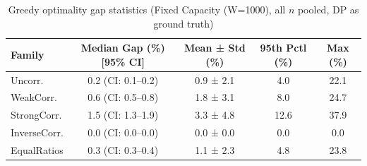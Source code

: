 \begin{table}[tb]
\centering
\caption{Greedy optimality gap statistics (Fixed Capacity (W=1000), all $n$ pooled, DP as ground truth)}
\label{tab:fixed-greedy-gap}
\begin{tabular}{lcccc}
\toprule
Family & Median Gap (\%) [95\% CI] & Mean ± Std (\%) & 95th Pctl (\%) & Max (\%) \\
\midrule
Uncorr. & 0.2 (CI: 0.1–0.2) & 0.9 ± 2.1 & 4.0 & 22.1 \\
WeakCorr. & 0.6 (CI: 0.5–0.8) & 1.8 ± 3.1 & 8.0 & 24.7 \\
StrongCorr. & 1.5 (CI: 1.3–1.9) & 3.3 ± 4.8 & 12.6 & 37.9 \\
InverseCorr. & 0.0 (CI: 0.0–0.0) & 0.0 ± 0.0 & 0.0 & 0.0 \\
EqualRatios & 0.3 (CI: 0.3–0.4) & 1.1 ± 2.3 & 4.8 & 23.8 \\
\bottomrule
\end{tabular}
\end{table}

